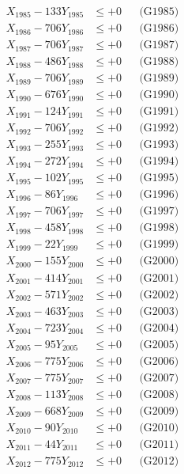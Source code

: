 \documentclass[a4paper,10pt]{article}
\begin{document}
{\begin{align}
X_{1985} - 133Y_{1985} &\leq +0 && \text{(G1985)} \\
X_{1986} - 706Y_{1986} &\leq +0 && \text{(G1986)} \\
X_{1987} - 706Y_{1987} &\leq +0 && \text{(G1987)} \\
X_{1988} - 486Y_{1988} &\leq +0 && \text{(G1988)} \\
X_{1989} - 706Y_{1989} &\leq +0 && \text{(G1989)} \\
X_{1990} - 676Y_{1990} &\leq +0 && \text{(G1990)} \\
\allowbreak
X_{1991} - 124Y_{1991} &\leq +0 && \text{(G1991)} \\
X_{1992} - 706Y_{1992} &\leq +0 && \text{(G1992)} \\
X_{1993} - 255Y_{1993} &\leq +0 && \text{(G1993)} \\
X_{1994} - 272Y_{1994} &\leq +0 && \text{(G1994)} \\
X_{1995} - 102Y_{1995} &\leq +0 && \text{(G1995)} \\
X_{1996} - 86Y_{1996} &\leq +0 && \text{(G1996)} \\
X_{1997} - 706Y_{1997} &\leq +0 && \text{(G1997)} \\
X_{1998} - 458Y_{1998} &\leq +0 && \text{(G1998)} \\
X_{1999} - 22Y_{1999} &\leq +0 && \text{(G1999)} \\
X_{2000} - 155Y_{2000} &\leq +0 && \text{(G2000)} \\
\allowbreak
X_{2001} - 414Y_{2001} &\leq +0 && \text{(G2001)} \\
X_{2002} - 571Y_{2002} &\leq +0 && \text{(G2002)} \\
X_{2003} - 463Y_{2003} &\leq +0 && \text{(G2003)} \\
X_{2004} - 723Y_{2004} &\leq +0 && \text{(G2004)} \\
X_{2005} - 95Y_{2005} &\leq +0 && \text{(G2005)} \\
X_{2006} - 775Y_{2006} &\leq +0 && \text{(G2006)} \\
X_{2007} - 775Y_{2007} &\leq +0 && \text{(G2007)} \\
X_{2008} - 113Y_{2008} &\leq +0 && \text{(G2008)} \\
X_{2009} - 668Y_{2009} &\leq +0 && \text{(G2009)} \\
X_{2010} - 90Y_{2010} &\leq +0 && \text{(G2010)} \\
\allowbreak
X_{2011} - 44Y_{2011} &\leq +0 && \text{(G2011)} \\
X_{2012} - 775Y_{2012} &\leq +0 && \text{(G2012)} \\

\end{align}}
\end{document}
